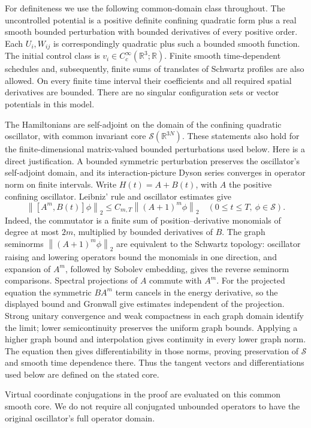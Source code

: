 \documentclass[11pt]{article}
\numberwithin{equation}{section}
\theoremstyle{definition}
\newcommand{\R}{\mathbb R}
\newcommand{\Sch}{\mathcal S}
\newcommand{\Cc}{C_c^\infty}
\newcommand{\norm}[1]{\left\|#1\right\|}
\begin{document}
For definiteness we use the following common-domain class throughout. The uncontrolled potential is a positive definite confining quadratic form plus a real smooth bounded perturbation with bounded derivatives of every positive order. Each \(U_i,W_{ij}\) is correspondingly quadratic plus such a bounded smooth function. The initial control class is \(v_i\in\Cc(\R^3;\R)\). Finite smooth time-dependent schedules and, subsequently, finite sums of translates of Schwartz profiles are also allowed. On every finite time interval their coefficients and all required spatial derivatives are bounded. There are no singular configuration sets or vector potentials in this model.

The Hamiltonians are self-adjoint on the domain of the confining quadratic oscillator, with common invariant core \(\Sch(\R^{3N})\). These statements also hold for the finite-dimensional matrix-valued bounded perturbations used below. Here is a direct justification. A bounded symmetric perturbation preserves the oscillator's self-adjoint domain, and its interaction-picture Dyson series converges in operator norm on finite intervals. Write \(H(t)=A+B(t)\), with \(A\) the positive confining oscillator. Leibniz' rule and oscillator estimates give
\[
 \norm{[A^m,B(t)]\phi}_2\le C_{m,T}\norm{(A+1)^m\phi}_2
 \quad(0\le t\le T,\ \phi\in\Sch).
\]
Indeed, the commutator is a finite sum of position--derivative monomials of degree at most \(2m\), multiplied by bounded derivatives of \(B\). The graph seminorms \(\norm{(A+1)^m\phi}_2\) are equivalent to the Schwartz topology: oscillator raising and lowering operators bound the monomials in one direction, and expansion of \(A^m\), followed by Sobolev embedding, gives the reverse seminorm comparisons. Spectral projections of \(A\) commute with \(A^m\). For the projected equation the symmetric \(B A^m\) term cancels in the energy derivative, so the displayed bound and Gronwall give estimates independent of the projection. Strong unitary convergence and weak compactness in each graph domain identify the limit; lower semicontinuity preserves the uniform graph bounds. Applying a higher graph bound and interpolation gives continuity in every lower graph norm. The equation then gives differentiability in those norms, proving preservation of \(\Sch\) and smooth time dependence there. Thus the tangent vectors and differentiations used below are defined on the stated core.

Virtual coordinate conjugations in the proof are evaluated on this common smooth core. We do not require all conjugated unbounded operators to have the original oscillator's full operator domain.
\end{document}
